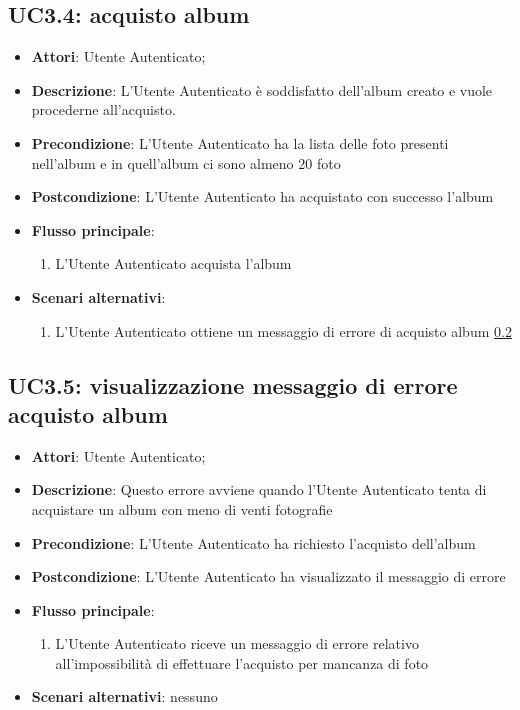 
\subsection{UC3.4: acquisto album}
\label{uc:uc3.4}

\begin{itemize}
  \item \textbf{Attori}: Utente Autenticato;
  \item \textbf{Descrizione}: L'Utente Autenticato è soddisfatto dell'album
creato e vuole procederne all'acquisto.
  \item \textbf{Precondizione}: L'Utente Autenticato ha la lista delle foto
presenti nell'album e in quell'album ci sono almeno 20 foto
  \item \textbf{Postcondizione}: L'Utente Autenticato ha acquistato con
successo l'album
  \item \textbf{Flusso principale}:
  \begin{enumerate}
    \item L'Utente Autenticato acquista l'album
  \end{enumerate}
  \item \textbf{Scenari alternativi}:
  \begin{enumerate}
    \item L'Utente Autenticato ottiene un messaggio di errore di acquisto album
\ref{uc:uc3.5}
  \end{enumerate}
\end{itemize}


\subsection{UC3.5: visualizzazione messaggio di errore acquisto album}
\label{uc:uc3.5}

\begin{itemize}
  \item \textbf{Attori}: Utente Autenticato;
  \item \textbf{Descrizione}: Questo errore avviene quando l'Utente Autenticato
tenta di acquistare un album con meno di venti fotografie
  \item \textbf{Precondizione}: L'Utente Autenticato ha richiesto l'acquisto
dell'album
  \item \textbf{Postcondizione}: L'Utente Autenticato ha visualizzato il
messaggio di errore
  \item \textbf{Flusso principale}:
  \begin{enumerate}
    \item L'Utente Autenticato riceve un messaggio di errore relativo
all'impossibilità di effettuare l'acquisto per mancanza di foto
  \end{enumerate}
  \item \textbf{Scenari alternativi}: nessuno
\end{itemize}


